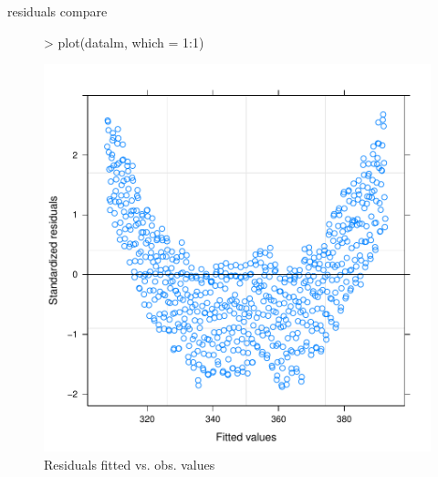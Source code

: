 \documentclass[11pt, a4paper]{article} %
\begin{document}
\linebreak
residuals compare\\
\begin{figure}[H]
\centering
\begin{Schunk}
\begin{Sinput}
> plot(datalm, which = 1:1)
\end{Sinput}
\end{Schunk}
\includegraphics{alleselena-043}
\caption{Residuals fitted vs. obs. values}
\label{comparison_finalgls1}
\end{figure}
\end{document}
